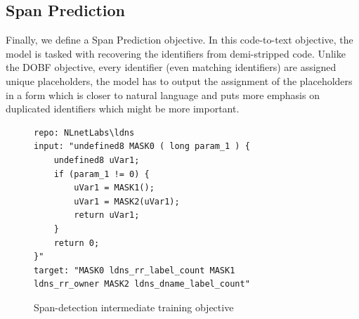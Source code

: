 \subsection{Span Prediction}
Finally, we define a Span Prediction objective. In this code-to-text objective, the model is tasked with recovering the identifiers from demi-stripped code. Unlike the DOBF objective, every identifier (even matching identifiers) are assigned unique placeholders, the model has to output the assignment of the placeholders in a form which is closer to natural language and puts more emphasis on duplicated identifiers which might be more important.

\label{fig:spanDetection}
\begin{figure}[H]
  \centering
\begin{lstlisting}
repo: NLnetLabs\ldns
input: "undefined8 MASK0 ( long param_1 ) { 
    undefined8 uVar1; 
    if (param_1 != 0) { 
        uVar1 = MASK1(); 
        uVar1 = MASK2(uVar1); 
        return uVar1; 
    } 
    return 0; 
}"
target: "MASK0 ldns_rr_label_count MASK1
ldns_rr_owner MASK2 ldns_dname_label_count"
\end{lstlisting}
  \caption{Span-detection intermediate training objective}
\end{figure}